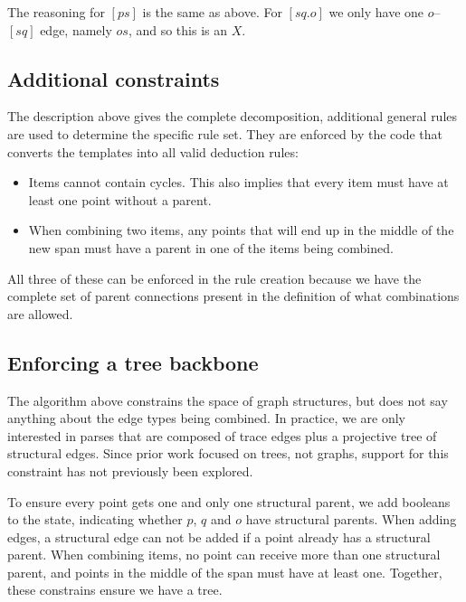 The reasoning for $[ps]$ is the same as above.
For $[sq.o]$ we only have one $o$--$[sq]$ edge, namely $os$, and so this is an $X$.


\subsection{Additional constraints}
The description above gives the complete decomposition, additional general rules are used to determine the specific rule set.
They are enforced by the code that converts the templates into all valid deduction rules:

\begin{itemize}
  \item Items cannot contain cycles.
  This also implies that every item must have at least one point without a parent.
  \item When combining two items, any points that will end up in the middle of the new span must have a parent in one of the items being combined.
\end{itemize}

All three of these can be enforced in the rule creation because we have the complete set of parent connections present in the definition of what combinations are allowed.

\subsection{Enforcing a tree backbone}
The algorithm above constrains the space of graph structures, but does not say anything about the edge types being combined.
In practice, we are only interested in parses that are composed of trace edges plus a projective tree of structural edges.
Since prior work focused on trees, not graphs, support for this constraint has not previously been explored.

To ensure every point gets one and only one structural parent, we add booleans to the state, indicating whether $p$, $q$ and $o$ have structural parents.
When adding edges, a structural edge can not be added if a point already has a structural parent.
When combining items, no point can receive more than one structural parent, and points in the middle of the span must have at least one.
Together, these constrains ensure we have a tree.

